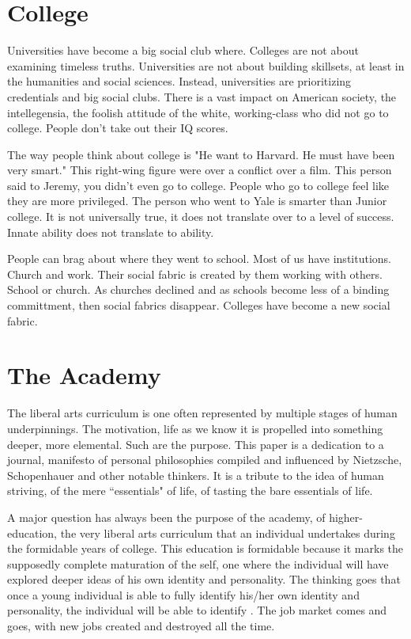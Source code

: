 \documentclass[12pt,letterpaper]{article}
\begin{document}
\section{College}
Universities have become a big social club where.  Colleges are not about examining timeless truths.  Universities are not about building skillsets, at least in the humanities and social sciences.  Instead, universities are prioritizing credentials and big social clubs.  There is a vast impact on American society, the intellegensia, the foolish attitude of the white, working-class who did not go to college.  People don't take out their IQ scores.

The way people think about college is "He want to Harvard.  He must have been very smart."  This right-wing figure were over a conflict over a film.  This person said to Jeremy, you didn't even go to college.  People who go to college feel like they are more privileged.  The person who went to Yale is smarter than Junior college.  It is not universally true, it does not translate over to a level of success.  Innate ability does not translate to ability.

People can brag about where they went to school.  Most of us have institutions.  Church and work.  Their social fabric is created by them working with others.  School or church.  As churches declined and as schools become less of a binding committment, then social fabrics disappear.  Colleges have become a new social fabric.  



\section{The Academy}
The liberal arts curriculum is one often represented by multiple stages of human underpinnings.  The motivation, life as we know it is propelled into something deeper, more elemental.  Such are the purpose.  This paper is a dedication to a journal, manifesto of personal philosophies compiled and influenced by Nietzsche, Schopenhauer and other notable thinkers.  It is a tribute to the idea of human striving, of the mere ``essentials" of life, of tasting the bare essentials of life.

A major question has always been the purpose of the academy, of higher-education, the very liberal arts curriculum that an individual undertakes during the formidable years of college.  This education is formidable because it marks the supposedly complete maturation of the self, one where the individual will have explored deeper ideas of his own identity and personality.  The thinking goes that once a young individual is able to fully identify his/her own identity and personality, the individual will be able to identify .  The job market comes and goes, with new jobs created and destroyed all the time.
\end{document}

